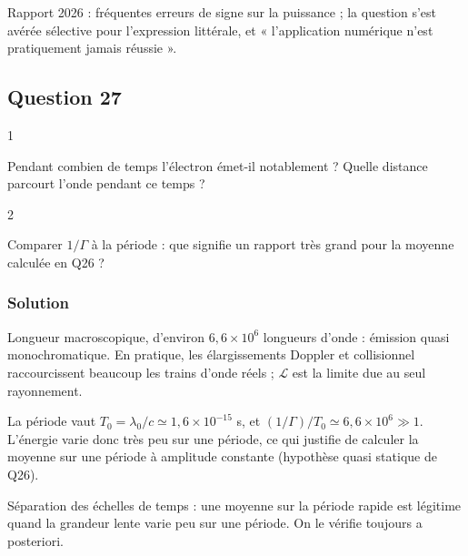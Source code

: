 \documentclass[11pt,a4paper]{article}
\newcommand{\equationajustee}[1]{%
  \sbox{\boiteequation}{$\displaystyle #1$}%
  \ifdim\wd\boiteequation>\linewidth
    \[\resizebox{\linewidth}{!}{\usebox{\boiteequation}}\]%
  \else
    \[#1\]%
  \fi}
\begin{document}
\begin{jury}

Rapport 2026 : fréquentes erreurs de signe sur la puissance ; la question s'est avérée sélective pour l'expression littérale, et « l'application numérique n'est pratiquement jamais réussie ».

\end{jury}

\hypertarget{question-27}{%
\subsection{Question 27}\label{question-27}}

\begin{indication}{1}

Pendant combien de temps l'électron émet-il notablement ? Quelle distance parcourt l'onde pendant ce temps ?

\end{indication}

\begin{indication}{2}

Comparer \(1/\Gamma\) à la période : que signifie un rapport très grand pour la moyenne calculée en Q26 ?

\end{indication}

\hypertarget{solution-26}{%
\subsubsection{Solution}\label{solution-26}}

\equationajustee{\mathcal L\simeq\frac{c}{\Gamma}=\frac{3{,}0\times10^8}{9{,}4\times10^7}}
\equationajustee{\boxed{\mathcal L\simeq3{,}2\ \mathrm m}}
Longueur macroscopique, d'environ \(6{,}6\times10^6\) longueurs d'onde : émission quasi monochromatique. En pratique, les élargissements Doppler et collisionnel raccourcissent beaucoup les trains d'onde réels ; \(\mathcal L\) est la limite due au seul rayonnement.

La période vaut \(T_0=\lambda_0/c\simeq1{,}6\times10^{-15}\) s, et \((1/\Gamma)/T_0\simeq6{,}6\times10^6\gg1\). L'énergie varie donc très peu sur une période, ce qui justifie de calculer la moyenne sur une période à amplitude constante (hypothèse quasi statique de Q26).

\begin{methode}

Séparation des échelles de temps : une moyenne sur la période rapide est légitime quand la grandeur lente varie peu sur une période. On le vérifie toujours a posteriori.

\end{methode}
\end{document}

